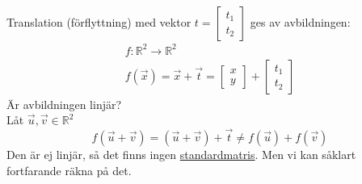 Translation (förflyttning) med vektor $t = \begin{bmatrix} t_1\\t_2 \end{bmatrix}$ ges av avbildningen:
\begin{gather*}
	f: \mathbb{R}^2 \rightarrow \mathbb{R}^2\\
	f(\vec{x}) = \vec{x} + \vec{t} = \begin{bmatrix} x\\y \end{bmatrix} + \begin{bmatrix} t_1\\t_2 \end{bmatrix}
\end{gather*}
Är avbildningen linjär?\\
Låt $\vec{u}, \vec{v} \in \mathbb{R}^2$
\[
    f(\vec{u} + \vec{v}) = (\vec{u} + \vec{v}) + \vec{t} \neq f(\vec{u}) + f(\vec{v})
\]
Den är ej linjär, så det finns ingen \underline{standardmatris}. Men vi kan såklart fortfarande räkna på det.
